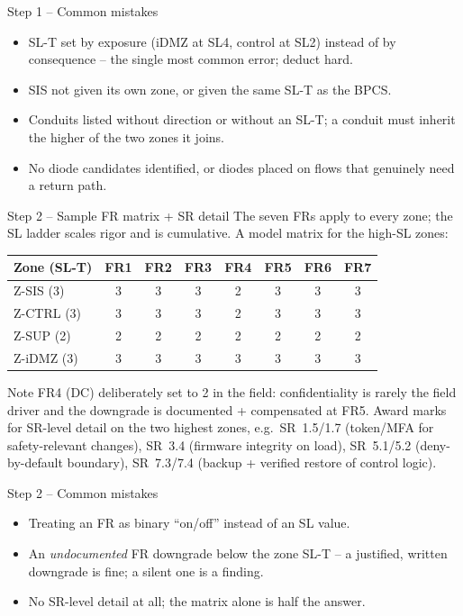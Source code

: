 \documentclass[11pt,a4paper]{article}
\begin{document}
\begin{solutionbox}{Step 1 -- Common mistakes}
\begin{itemize}\setlength{\itemsep}{1pt}
  \item SL-T set by exposure (iDMZ at SL4, control at SL2) instead of by
    consequence -- the single most common error; deduct hard.
  \item SIS not given its own zone, or given the same SL-T as the BPCS.
  \item Conduits listed without direction or without an SL-T; a conduit
    must inherit the higher of the two zones it joins.
  \item No diode candidates identified, or diodes placed on flows that
    genuinely need a return path.
\end{itemize}
\end{solutionbox}

\begin{solutionbox}{Step 2 -- Sample FR matrix + SR detail}
The seven FRs apply to every zone; the SL ladder scales rigor and is
cumulative. A model matrix for the high-SL zones:

\vspace{2pt}
\small
\begin{tabular}{@{}p{2.4cm}ccccccc@{}}
\toprule
\textbf{Zone (SL-T)} & \textbf{FR1} & \textbf{FR2} & \textbf{FR3} & \textbf{FR4} & \textbf{FR5} & \textbf{FR6} & \textbf{FR7} \\
\midrule
Z-SIS  (3) & 3 & 3 & 3 & 2 & 3 & 3 & 3 \\
Z-CTRL (3) & 3 & 3 & 3 & 2 & 3 & 3 & 3 \\
Z-SUP  (2) & 2 & 2 & 2 & 2 & 2 & 2 & 2 \\
Z-iDMZ (3) & 3 & 3 & 3 & 3 & 3 & 3 & 3 \\
\bottomrule
\end{tabular}
\normalsize
\par\vspace{2mm}
Note FR4 (DC) deliberately set to 2 in the field: confidentiality is
rarely the field driver and the downgrade is documented + compensated at
FR5. Award marks for SR-level detail on the two highest zones, e.g.\
SR~1.5/1.7 (token/MFA for safety-relevant changes), SR~3.4 (firmware
integrity on load), SR~5.1/5.2 (deny-by-default boundary), SR~7.3/7.4
(backup + verified restore of control logic).
\end{solutionbox}

\begin{solutionbox}{Step 2 -- Common mistakes}
\begin{itemize}\setlength{\itemsep}{1pt}
  \item Treating an FR as binary ``on/off'' instead of an SL value.
  \item An \emph{undocumented} FR downgrade below the zone SL-T -- a
    justified, written downgrade is fine; a silent one is a finding.
  \item No SR-level detail at all; the matrix alone is half the answer.
\end{itemize}
\end{solutionbox}
\end{document}
